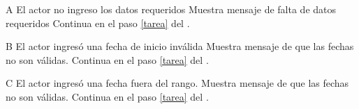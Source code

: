 		\begin{UCtrayectoriaA}{A}{ El actor no ingreso los datos requeridos}
			\UCpaso Muestra mensaje de falta de datos requeridos
			\UCpaso Continua en el paso \ref{tarea} del .
		\end{UCtrayectoriaA}
		\begin{UCtrayectoriaA}{B}{ El actor ingresó una fecha de inicio inválida}
			\UCpaso Muestra mensaje de que las fechas no son válidas.
			\UCpaso Continua en el paso \ref{tarea} del .
		\end{UCtrayectoriaA}
		\begin{UCtrayectoriaA}{C}{ El actor ingresó una fecha fuera del rango. }
			\UCpaso Muestra mensaje de que las fechas no son válidas.
			\UCpaso Continua en el paso \ref{tarea} del .
		\end{UCtrayectoriaA}
		
		
